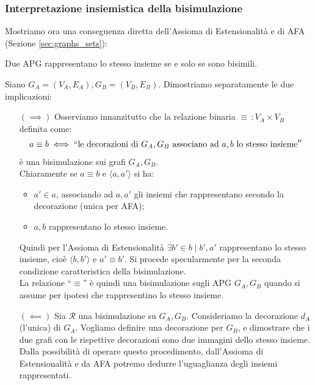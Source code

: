 \subsubsection{Interpretazione insiemistica della bisimulazione}
Mostriamo ora una conseguenza diretta dell'Assioma di Estensionalità e di AFA (Sezione \ref{sec:graphs_sets}):
\begin{theorem}
    Due APG rappresentano lo stesso insieme se e solo se sono bisimili.
    \label{theo:bisi_iff_eqsets}
\end{theorem}
\begin{proof2}
    Siano $G_A = (V_A, E_A), G_B = (V_B, E_B)$. Dimostriamo separatamente le due implicazioni:
    \begin{enumerate}
        \item[$(\implies)$] Osserviamo innanzitutto che la relazione binaria $\equiv \,: V_A \times V_B$ definita come:
        \begin{gather*}
            a \equiv b \iff ``\text{le decorazioni di } G_A,G_B \text{ associano ad } a,b \text{ lo stesso insieme}''
        \end{gather*}
        è una bisimulazione sui grafi $G_A, G_B$.\\
        Chiaramente se $a \equiv b$ e $\langle a, a' \rangle$ si ha:
        \begin{itemize}
            \item $a' \in a$, associando ad $a,a'$ gli insiemi che rappresentano secondo la decorazione (unica per AFA);
            \item $a,b$ rappresentano lo stesso insieme.
        \end{itemize}
        Quindi per l'Assioma di Estensionalità $\exists b' \in b\mid b',a'$ rappresentano lo stesso insieme, cioè $\langle b, b' \rangle$ e $a' \equiv b'$. Si procede specularmente per la seconda condizione caratteristica della bisimulazione.\\
        La relazione ``$\equiv$'' è quindi una bisimulazione sugli APG $G_A,G_B$ quando si assume per ipotesi che rappresentino lo stesso insieme.
        \item[$(\impliedby)$] Sia $\mathcal{R}$ una bisimulazione su $G_A,G_B$. Consideriamo la decorazione $d_A$ (l'unica) di $G_A$. Vogliamo definire una decorazione per $G_B$, e dimostrare che i due grafi con le rispettive decorazioni sono due immagini dello stesso insieme. Dalla possibilità di operare questo procedimento, dall'Assioma di Estensionalità e da AFA potremo dedurre l'uguaglianza degli insiemi rappresentati.


\end{enumerate}
\end{proof2}
